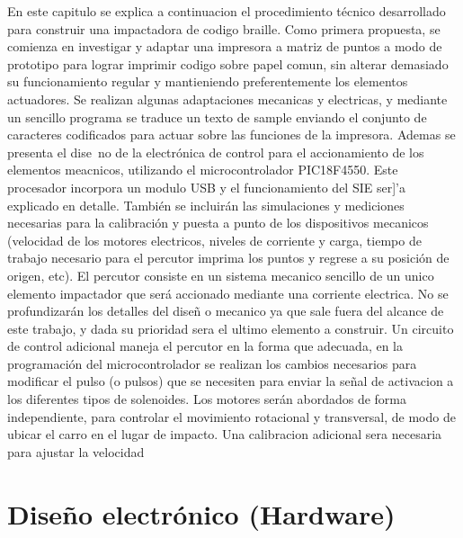 En este capitulo se explica a continuacion el procedimiento t\'ecnico
desarrollado para construir una impactadora de codigo braille.
Como primera propuesta, se comienza en investigar y adaptar una impresora a
matriz de puntos a modo de prototipo para lograr imprimir codigo sobre papel
comun, sin alterar demasiado su funcionamiento regular y mantieniendo
preferentemente los elementos actuadores.
Se realizan algunas adaptaciones mecanicas y electricas, y mediante un sencillo
programa se traduce un texto de sample enviando el conjunto de caracteres
codificados para actuar sobre las funciones de la impresora.
Ademas se presenta el dise~no de la electr\'onica de control para el
accionamiento de los elementos meacnicos, utilizando el microcontrolador
PIC18F4550. Este procesador incorpora un modulo USB y el funcionamiento del SIE
ser]'a explicado en detalle.
Tambi\'en se incluir\'an las simulaciones y mediciones necesarias para la
calibraci\'on y puesta a punto de los dispositivos mecanicos (velocidad de los
motores electricos, niveles de corriente y carga, tiempo de trabajo necesario
para el percutor imprima los puntos y regrese a su posici\'on de origen, etc).
El percutor consiste en un sistema mecanico sencillo de un unico elemento
impactador que ser\'a accionado mediante una corriente electrica. 
No se profundizar\'an los detalles del dise\~n o mecanico ya que sale fuera
del alcance de este trabajo, y dada su prioridad sera el ultimo elemento a
construir.
Un circuito de control adicional maneja el percutor en la forma que adecuada,
en la programaci\'on del microcontrolador se realizan los cambios necesarios 
para modificar el pulso (o pulsos) que se necesiten para enviar la se\~nal de 
activacion a los diferentes tipos de solenoides.
Los motores ser\'an abordados de forma independiente, para controlar el
movimiento 
rotacional y transversal, de modo de ubicar el carro en el lugar de impacto. 
Una calibracion adicional sera necesaria para ajustar la velocidad

\section {Dise\~no electr\'onico (Hardware)}

%
%
%

